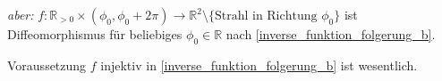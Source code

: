 \begin{example}
\begin{underlinedenvironment}[beachte]
		\emph{aber:} $f:\mathbb{R}_{>0}\times(\phi_0, \phi_0+2\pi)\to\mathbb{R}^2\setminus \{\text{Strahl in Richtung $\phi_0$}\}$ ist Diffeomorphismus für beliebiges $\phi_0\in \mathbb{R}$ nach  \ref{inverse_funktion_folgerung_b}.
	\end{underlinedenvironment}

	\begin{underlinedenvironment}[folglich]
		Voraussetzung $f$ injektiv in  \ref{inverse_funktion_folgerung_b} ist wesentlich.
	\end{underlinedenvironment}
\end{example}